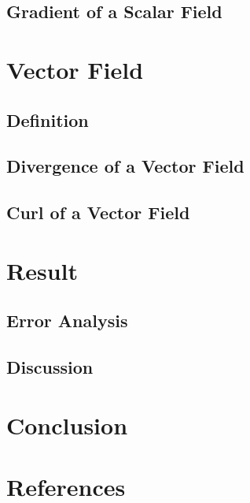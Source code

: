 \documentclass[12pt]{article}
\begin{document}
\subsection{Gradient of a Scalar Field}



\newpage
\section{Vector Field}
\subsection{Definition}



\subsection{Divergence of a Vector Field}



\subsection{Curl of a Vector Field}



\newpage
\section{Result}
\subsection{Error Analysis}



\subsection{Discussion}



\newpage
\section{Conclusion}



\newpage
\section{References}


\nocite{El-Deeb_PEU-218_Assignments}
\end{document}
